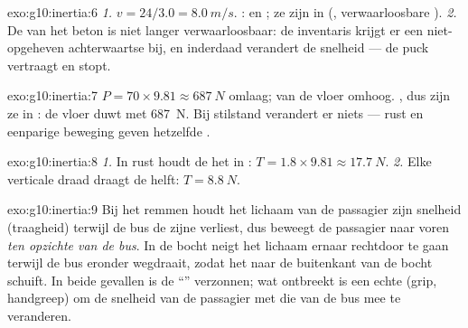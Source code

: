 \begin{solution}{exo:g10:inertia:6}
\emph{1.} $v = 24/3.0 = \qty{8.0}{m/s}$. :  en
; ze zijn in  (,
verwaarloosbare ). \emph{2.} De  van het beton is niet
langer verwaarloosbaar: de inventaris krijgt er een niet-opgeheven
achterwaartse  bij, en inderdaad verandert de snelheid --- de puck
vertraagt en stopt.
\end{solution}

\begin{solution}{exo:g10:inertia:7}
 $P = 70 \times 9.81 \approx \qty{687}{N}$ omlaag;  van de
vloer omhoog. , dus zijn ze in :
de vloer duwt met \qty{687}{N}. Bij stilstand verandert er niets ---
rust en eenparige beweging geven hetzelfde .
\end{solution}

\begin{solution}{exo:g10:inertia:8}
\emph{1.} In rust houdt de  het  in :
$T = 1.8 \times 9.81 \approx \qty{17.7}{N}$. \emph{2.} Elke verticale
draad draagt de helft: $T = \qty{8.8}{N}$.
\end{solution}

\begin{solution}{exo:g10:inertia:9}
Bij het remmen houdt het lichaam van de passagier zijn snelheid
(traagheid) terwijl de bus de zijne verliest, dus beweegt de passagier
naar voren \emph{ten opzichte van de bus}. In de bocht neigt het lichaam
ernaar rechtdoor te gaan terwijl de bus eronder wegdraait, zodat het naar
de buitenkant van de bocht schuift. In beide gevallen is de ``''
verzonnen; wat ontbreekt is een echte  (grip, handgreep) om de
snelheid van de passagier met die van de bus mee te veranderen.
\end{solution}

